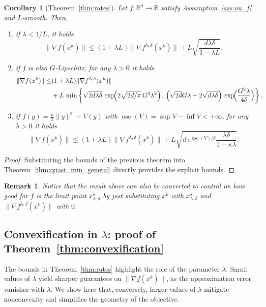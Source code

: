 \documentclass{article}
\newtheorem{corollary}{Corollary}
\newtheorem{remark}{Remark}
\newcommand{\R}{\mathbb{R}}
\begin{document}
\begin{corollary}[Theorem~\ref{thm:rates}]\label{cor:quasi_min_small_lambda}
    Let $f:\R^d\to \R$ satisfy Assumption~\ref{ass:on_f} and $L$-smooth. Then, 
    \begin{enumerate}
        \item[(i)] if $\lambda < 1/L$, it holds
        \[\|\nabla f(x^k)\| \leq (1+\lambda L)\| \nabla f^{\lambda,\delta}(x^k)\| + L \sqrt{\frac{d \lambda \delta}{1-\lambda L}}.\]
        \item[(ii)] if $f$ is also $G$-Lipschitz, for any $\lambda >0$ it holds
\[\begin{aligned}\|\nabla f(x^k)\| \leq & (1+\lambda L)\| \nabla f^{\lambda,\delta}(x^k)\| \\
&+ L\,
\min\left\{
\sqrt{2d \lambda\delta}\,
\exp\!\Bigl(2\sqrt{2d/\pi}\,G^2\lambda^2\Bigr),\;
\left(\sqrt{2 d}G\lambda+2\sqrt{d\lambda\delta}\right)\,
\exp\!\Bigl(\frac{G^2\lambda}{4\delta}\Bigr)
\right\}.
\end{aligned}\]
\item[(iii)] if $f(y)=\frac{\kappa}{2}\|y\|^2+V(y)$ with $\operatorname{osc}(V)= \sup V - \inf V <+\infty$, for any $\lambda>0$ it holds
\[
\|\nabla f(x^k)\|
\le
(1+\lambda L)\|\nabla f^{\lambda,\delta}(x^k)\|
+
L\sqrt{
d\,e^{\operatorname{osc}(V)/\delta}
\frac{\lambda\delta}{1+\kappa\lambda}
}.
\]
    \end{enumerate}
\end{corollary}
\begin{proof}
    Substituting the bounds of the previous theorem into Theorem~\ref{thm:quasi_min_general} directly provides the explicit bounds.
\end{proof}

\begin{remark}
    Notice that the result above can also be converted to control on how good for $f$ is the limit point $x_{\lambda,\delta}^\star$ by just substituting $x^k$ with $x_{\lambda,\delta}^\star$ and $\|\nabla f^{\lambda,\delta}(x^k)\|$ with $0$.
\end{remark}

\subsection{Convexification in $\lambda$: proof of Theorem~\ref{thm:convexification}}\label{app:proof_of_convexification}

The bounds in Theorem~\ref{thm:rates} highlight the role of the parameter $\lambda$. Small values of $\lambda$ yield sharper guarantees on $\|\nabla f(x^k)\|$, as the approximation error vanishes with $\lambda$. We show here that, conversely, larger values of $\lambda$ mitigate nonconvexity and simplifies the geometry of the objective.
\end{document}
